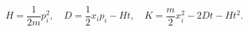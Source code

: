 \begin{equation}
H=\frac{1}{2m} p_i^2,\quad
D=\frac{1}{2}x_ip_i-Ht,\quad
K=\frac{m}{2}x_i^2 -2Dt -Ht^2.
\label{gso}
\end{equation}

